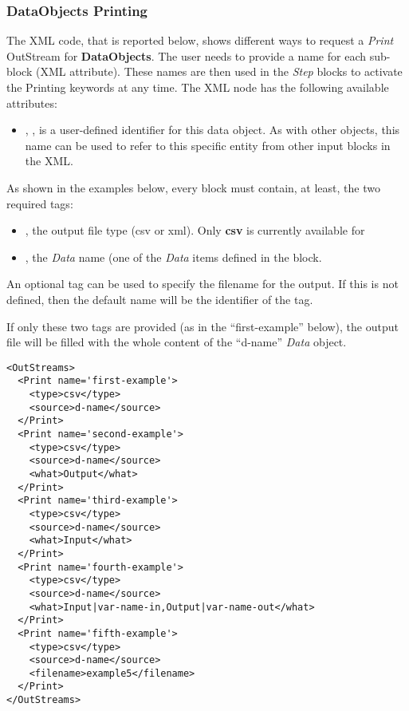 \subsubsection{\textbf{DataObjects} Printing}
The XML code, that is reported below, shows different ways to request a
\textit{Print} OutStream for \textbf{DataObjects}.
%
The user needs to provide a name for each sub-block (XML attribute).
%
These names are then used in the \textit{Step} blocks to activate the Printing
keywords at any time.
%
The XML node has the following
available attributes:
\begin{itemize}
  \itemsep0em
  \item {}, , is a user-defined
  identifier for this data object.
  \nb As with other objects, this name can be used to refer to this specific
  entity from other input blocks in the XML.
 \end{itemize}
As shown in the examples below, every  block must contain, at
least, the two required tags:
\vspace{-5mm}
\begin{itemize}
  \itemsep0em
  \item {}, the output file type (csv or xml).
  \nb Only \textbf{csv} is currently available for 
  \item {}, the \textit{Data} name (one of the \textit{Data} items
  defined in the  block.
\end{itemize}
\vspace{-5mm}

An optional tag  can be used to specify the filename for the
output. If this is not defined, then the default name will be the 
identifier of the tag.

If only these two tags are provided (as in the ``first-example'' below), the
output file will be filled with the whole content of the ``d-name''
\textit{Data} object.
%
\begin{lstlisting}[style=XML]
<OutStreams>
  <Print name='first-example'>
    <type>csv</type>
    <source>d-name</source>
  </Print>
  <Print name='second-example'>
    <type>csv</type>
    <source>d-name</source>
    <what>Output</what>
  </Print>
  <Print name='third-example'>
    <type>csv</type>
    <source>d-name</source>
    <what>Input</what>
  </Print>
  <Print name='fourth-example'>
    <type>csv</type>
    <source>d-name</source>
    <what>Input|var-name-in,Output|var-name-out</what>
  </Print>
  <Print name='fifth-example'>
    <type>csv</type>
    <source>d-name</source>
    <filename>example5</filename>
  </Print>
</OutStreams>
\end{lstlisting}

